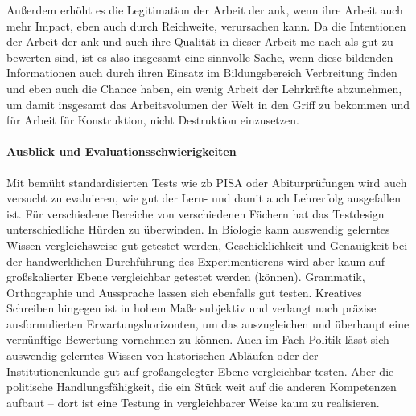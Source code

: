 Außerdem erhöht es die Legitimation der Arbeit der \gls{ank}, wenn ihre Arbeit auch mehr Impact, eben auch durch Reichweite, verursachen kann. Da die Intentionen der Arbeit der \gls{ank} und auch ihre Qualität in dieser Arbeit \gls{me} nach als gut zu bewerten sind, ist es also insgesamt eine sinnvolle Sache, wenn diese bildenden Informationen auch durch ihren Einsatz im Bildungsbereich Verbreitung finden und eben auch die Chance haben, ein wenig Arbeit der Lehrkräfte abzunehmen, um damit insgesamt das Arbeitsvolumen der Welt in den Griff zu bekommen und für Arbeit für Konstruktion, nicht Destruktion einzusetzen. 



\paragraph{Ausblick und Evaluationsschwierigkeiten}
Mit bemüht standardisierten Tests wie \gls{zb} PISA oder Abiturprüfungen wird auch versucht zu evaluieren, wie gut der Lern- und damit auch Lehrerfolg ausgefallen ist. Für verschiedene Bereiche von verschiedenen Fächern hat das Testdesign unterschiedliche Hürden zu überwinden. 
In Biologie kann auswendig gelerntes Wissen vergleichsweise gut getestet werden, Geschicklichkeit und Genauigkeit bei der handwerklichen Durchführung des Experimentierens wird aber kaum auf großskalierter Ebene vergleichbar getestet werden (können).
Grammatik, Orthographie und Aussprache lassen sich ebenfalls gut testen. Kreatives Schreiben hingegen ist in hohem Maße subjektiv und verlangt nach präzise ausformulierten Erwartungshorizonten, um das auszugleichen und überhaupt eine vernünftige Bewertung vornehmen zu können. 
Auch im Fach Politik lässt sich auswendig gelerntes Wissen von historischen Abläufen oder der Institutionenkunde gut auf großangelegter Ebene vergleichbar testen. Aber die politische Handlungsfähigkeit, die ein Stück weit auf die anderen Kompetenzen aufbaut -- dort ist eine Testung in vergleichbarer Weise kaum zu realisieren. 

